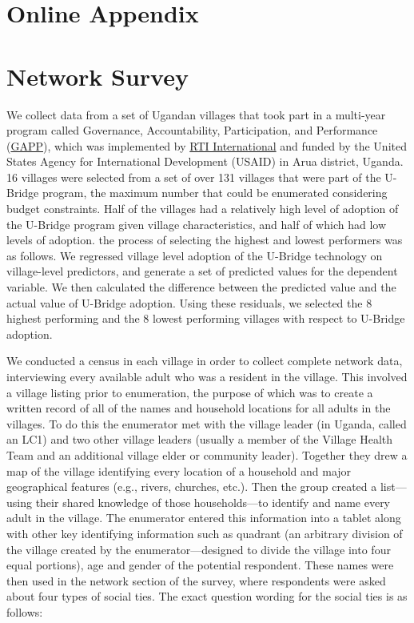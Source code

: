 \documentclass[12pt]{article}
\begin{document}
\doublespacing
\begin{appendix}
\section*{Online Appendix}
\setcounter{page}{1}
\section{Network Survey}\label{appendix_surveydetails}
We collect data from a set of Ugandan villages that took part in a multi-year program called Governance, Accountability, Participation, and Performance (\href{https://www.rti.org/impact/uganda-governance-accountability-participation-and-performance-gapp}{GAPP}), which was implemented by \href{https://www.rti.org/}{RTI International} and funded by the United States Agency for International Development (USAID) in Arua district, Uganda. 16 villages were selected from a set of over 131 villages that were part of the U-Bridge program, the maximum number that could be enumerated considering budget constraints. Half of the villages had a relatively high level of adoption of the U-Bridge program given village characteristics, and half of which had low levels of adoption. the process of selecting the highest and lowest performers was as follows. We regressed village level adoption of the U-Bridge technology on village-level predictors, and generate a set of predicted values for the dependent variable. We then calculated the difference between the predicted value and the actual value of U-Bridge adoption. Using these residuals, we selected the 8 highest performing and the 8 lowest performing villages with respect to U-Bridge adoption.

We conducted a census in each village in order to collect complete network data, interviewing every available adult who was a resident in the village. This involved a village listing prior to enumeration, the purpose of which was to create a written record of all of the names and household locations for all adults in the villages. To do this the enumerator met with the village leader (in Uganda, called an LC1) and two other village leaders (usually a member of the Village Health Team and an additional village elder or community leader). Together they drew a map of the village identifying every location of a household and major geographical features (e.g., rivers, churches, etc.). Then the group created a list---using their shared knowledge of those households---to identify and name every adult in the village. The enumerator entered this information into a tablet along with other key identifying information such as quadrant (an arbitrary division of the village created by the enumerator---designed to divide the village into four equal portions), age and gender of the potential respondent. These names were then used in the network section of the survey, where respondents were asked about four types of social ties. The exact question wording for the social ties is as follows:


\end{appendix}
\end{document}
